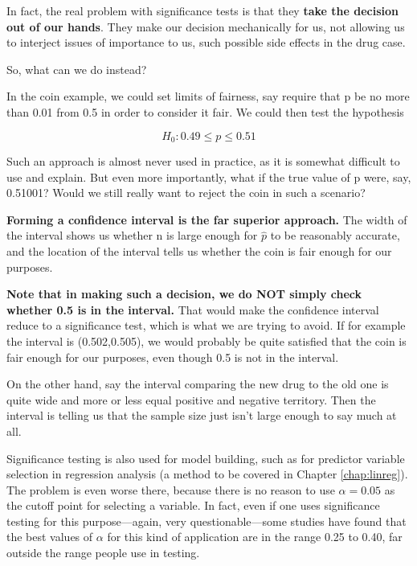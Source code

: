 In fact, the real problem with significance tests is that they {\bf take
the decision out of our hands}.  They make our decision mechanically for
us, not allowing us to interject issues of importance to us, such
possible side effects in the drug case.

So, what can we do instead?

In the coin example, we could set limits of fairness, say require that p
be no more than 0.01 from 0.5 in order to consider it fair.  We could
then test the hypothesis

\begin{equation}
H_0:  0.49 \leq p \leq 0.51
\end{equation}

Such an approach is almost never used in practice, as it is somewhat
difficult to use and explain.  But even more importantly, what if the
true value of p were, say, 0.51001?  Would we still really want to
reject the coin in such a scenario?

{\bf Forming a confidence interval is the far superior approach.}  The width
of the interval shows us whether n is large enough for $\widehat{p}$ to be
reasonably accurate, and the location of the interval tells us whether
the coin is fair enough for our purposes.

{\bf Note that in making such a decision, we do NOT simply check whether
0.5 is in the interval.}  That would make the confidence interval reduce
to a significance test, which is what we are trying to avoid.  If for
example the interval is (0.502,0.505), we would probably be quite
satisfied that the coin is fair enough for our purposes, even though 0.5
is not in the interval.

On the other hand, say the interval comparing the new drug to the old
one is quite wide and more or less equal positive and negative
territory.  Then the interval is telling us that the sample size just
isn't large enough to say much at all.

Significance testing is also used for model building, such as for
predictor variable selection in regression analysis (a method to be
covered in Chapter \ref{chap:linreg}).  The problem is even worse there,
because there is no reason to use $\alpha = 0.05$ as the cutoff point
for selecting a variable.  In fact, even if one uses significance
testing for this purpose---again, very questionable---some studies have
found that the best values of $\alpha$ for this kind of application are
in the range 0.25 to 0.40, far outside the range people use in testing.

